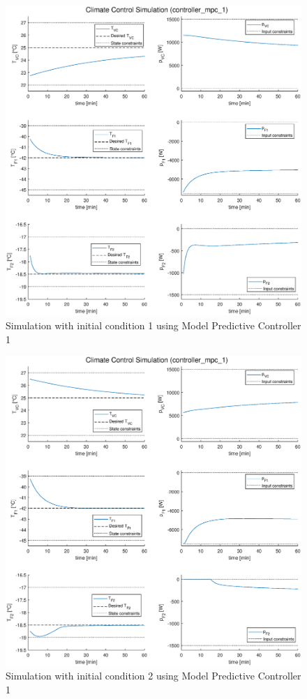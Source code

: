 \documentclass[a4paper,twoside,11pt]{article}
\numberwithin{equation}{section}
\begin{document}
\begin{figure}[ht]
\centering
\includegraphics[scale = 0.58]{image/11-1.eps}
\caption{Simulation with initial condition 1 using Model Predictive Controller 1}
\label{fig:7}
\end{figure}

\newpage

\begin{figure}[ht]
\centering
\includegraphics[scale = 0.58]{image/11-2.eps}
\caption{Simulation with initial condition 2 using Model Predictive Controller 1}
\label{fig:8}
\end{figure}
\end{document}
